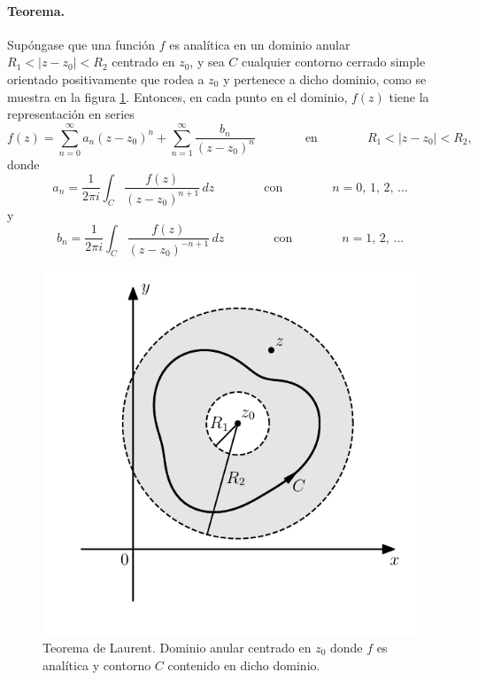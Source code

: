 \documentclass[a4paper]{report}
\begin{document}
\paragraph{Teorema.} Supóngase que una función \(f\) es analítica en un dominio anular \(R_1<|z-z_0|<R_2\) centrado en \(z_0\), y sea \(C\) cualquier contorno cerrado simple orientado positivamente que rodea a \(z_0\) y pertenece a dicho dominio, como se muestra en la figura \ref{fig:laurent_theorem}. Entonces, en cada punto en el dominio, \(f(z)\) tiene la representación en series
\begin{equation}\label{eq:laurent_series_definition}
 f(z)=\sum_{n=0}^\infty a_n(z-z_0)^n+\sum_{n=1}^\infty\frac{b_n}{(z-z_0)^n}
 \qquad\qquad\textrm{en}\qquad\qquad
 R_1<|z-z_0|<R_2,
\end{equation}
donde
\begin{equation}\label{eq:laurent_series_an_definition}
 a_n=\frac{1}{2\pi i}\int_C\frac{f(z)}{(z-z_0)^{n+1}}\,dz
 \qquad\qquad\textrm{con}\qquad\qquad
 n=0,\,1,\,2,\,\dots
\end{equation}
y
\begin{equation}\label{eq:laurent_series_bn_definition}
 b_n=\frac{1}{2\pi i}\int_C\frac{f(z)}{(z-z_0)^{-n+1}}\,dz
 \qquad\qquad\textrm{con}\qquad\qquad
 n=1,\,2,\,\dots
\end{equation}
\begin{figure}[!htb]
  \begin{minipage}[c]{0.5\textwidth}
    \includegraphics[width=\textwidth]{figuras/laurent_theorem.pdf}
  \end{minipage}\hfill
  \begin{minipage}[c]{0.4\textwidth}
    \caption{
       Teorema de Laurent. Dominio anular centrado en \(z_0\) donde \(f\) es analítica y contorno \(C\) contenido en dicho dominio.
    }\label{fig:laurent_theorem}
  \end{minipage}
\end{figure}
\end{document}

